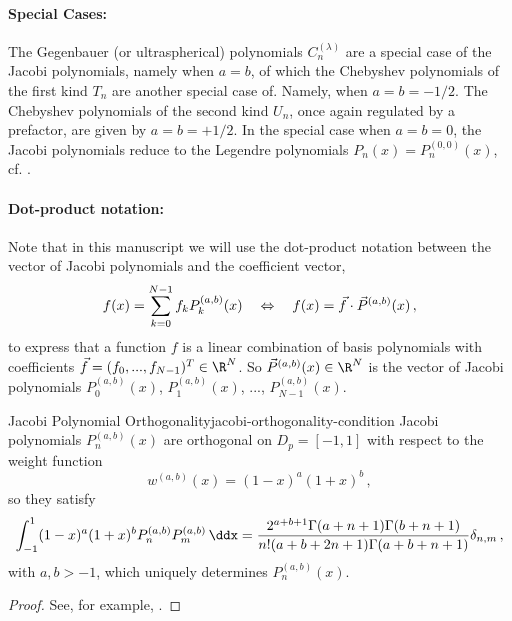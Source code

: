 \paragraph{Special Cases:}
The Gegenbauer (or ultraspherical) polynomials $C_n^{(\lambda)}$ are a special case of the Jacobi polynomials, namely when $a = b$,
of which the Chebyshev polynomials of the first kind $T_n$ are another special case of.
Namely, when $a = b = -1/2$.
The Chebyshev polynomials of the second kind $U_n$, once again regulated by a prefactor, are given by $a = b = +1/2$.
In the special case when $a = b = 0$, the Jacobi polynomials reduce to the Legendre polynomials $P_n(x) = P_n^{(0, 0)}(x)$, cf. \cite{2018-nist}.


\paragraph{Dot-product notation:}
Note that in this manuscript we will use the dot-product notation between the vector of Jacobi polynomials and the coefficient vector,
$$f(x) = \sum_{k=0}^{N-1} f_k P_k^{(a, b)}(x) \quad\Leftrightarrow\quad f(x) = \vec{f} \cdot \vec{P}^{(a, b)}(x)\,,$$
to express that a function $f$ is a linear combination of basis polynomials with coefficients $\vec{f} = (f_0, ..., f_{N-1})^T \in \R^N$.
So $\vec{P}^{(a, b)}(x) \in \R^N$ is the vector of Jacobi polynomials $P^{(a, b)}_0(x)$, $P^{(a, b)}_1(x)$, ..., $P^{(a, b)}_{N-1}(x)$.

\begin{theorem}{Jacobi Polynomial Orthogonality}{jacobi-orthogonality-condition}
  Jacobi polynomials $P_n^{(a,b)}(x)$ are orthogonal on $D_p = [-1,1]$ with respect to the weight function
  \begin{equation*}
    w^{(a,b)}(x)=(1-x)^a (1+x)^b\,,
  \end{equation*}
  so they satisfy
  \begin{align*}
    \int_{-1}^1(1-x)^a(1+x)^bP_n^{(a,b)}P_m^{(a,b)}\,\ddx = \frac{2^{a+b+1} \Gamma (a+n+1) \Gamma (b+n+1)}{n! (a+b+2 n+1) \Gamma (a+b+n+1)} \delta_{n,m}\,,
  \end{align*}
  with $a	,b>-1$, which uniquely determines $P_n^{(a,b)}(x)$.
\end{theorem}
\begin{proof}
  See, for example, \cite{1995-jacobi-orthogonality-proof}.
\end{proof}

